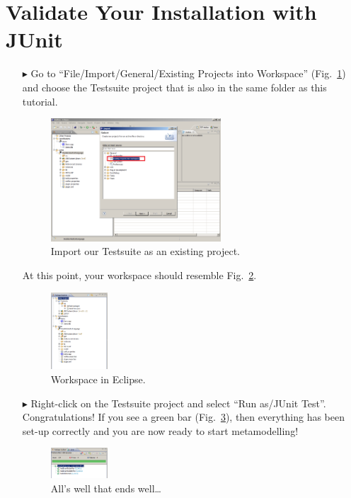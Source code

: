 \section{Validate Your Installation with JUnit}

\begin{enumerate}
\item[$\blacktriangleright$] Go to ``File/Import/General/Existing Projects
into Workspace'' (Fig.~\ref{fig_eclipseTestsuiteImport}) and choose the
Testsuite project that is also in the same folder as this tutorial. 
\begin{figure}[!h]
	\centering
  \includegraphics[width=0.6\textwidth]{pics/eclipse_testsuitimport.png}
	\caption{Import our Testsuite as an existing project.}
	\label{fig_eclipseTestsuiteImport}
\end{figure}

\newpage 

\item[] At this point, your workspace should resemble
Fig.~\ref{fig_eclipsepackageexplorer}.
\begin{figure}[!h]
	\centering
  \includegraphics[width=0.2\textwidth]{pics/eclipse_packageexplorer.png}
	\caption{Workspace in Eclipse.}
	\label{fig_eclipsepackageexplorer}
\end{figure}

\item[$\blacktriangleright$] Right-click on the Testsuite project and select
``Run as/JUnit Test''.
Congratulations!  If you see a green bar  (Fig.~\ref{fig_eclipsetestsuiterun}),
then everything has been set-up correctly and you are now ready to start
metamodelling!
\begin{figure}[!h]
	\centering
  \includegraphics[width=0.2\textwidth]{pics/eclipse_testsuiterun.png}
	\caption{All's well that ends well\ldots}
	\label{fig_eclipsetestsuiterun}
\end{figure}
\end{enumerate}